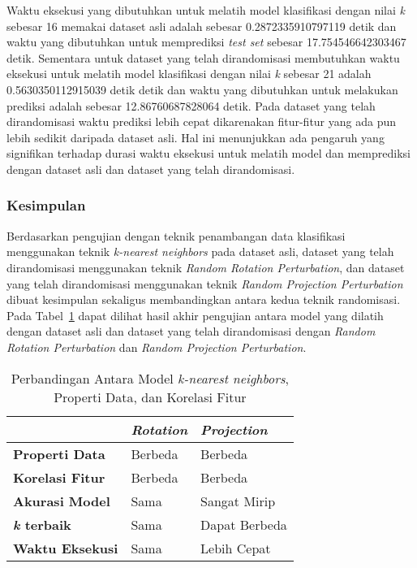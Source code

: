 Waktu eksekusi yang dibutuhkan untuk melatih model klasifikasi dengan nilai \textit{k} sebesar 16 memakai dataset asli adalah sebesar 0.2872335910797119 detik dan waktu yang dibutuhkan untuk memprediksi \textit{test set} sebesar 17.754546642303467 detik. Sementara untuk dataset yang telah dirandomisasi membutuhkan waktu eksekusi untuk melatih model klasifikasi dengan nilai \textit{k} sebesar 21 adalah 0.5630350112915039 detik detik dan waktu yang dibutuhkan untuk melakukan prediksi adalah sebesar 12.86760687828064 detik. Pada dataset yang telah dirandomisasi waktu prediksi lebih cepat dikarenakan fitur-fitur yang ada pun lebih sedikit daripada dataset asli. Hal ini menunjukkan ada pengaruh yang signifikan terhadap durasi waktu eksekusi untuk melatih model dan memprediksi dengan dataset asli dan dataset yang telah dirandomisasi.

\subsubsection{Kesimpulan}
\label{subsubsec:pengujian-klasifikasi-kesimpulan}

Berdasarkan pengujian dengan teknik penambangan data klasifikasi menggunakan teknik \textit{k-nearest neighbors} pada dataset asli, dataset yang telah dirandomisasi menggunakan teknik \textit{Random Rotation Perturbation}, dan dataset yang telah dirandomisasi menggunakan teknik \textit{Random Projection Perturbation} dibuat kesimpulan sekaligus membandingkan antara kedua teknik randomisasi. Pada Tabel~\ref{table:perbandingan-klasifikasi} dapat dilihat hasil akhir pengujian antara model yang dilatih dengan dataset asli dan dataset yang telah dirandomisasi dengan \textit{Random Rotation Perturbation} dan \textit{Random Projection Perturbation}.

\begin{table}
	\centering
	\caption{Perbandingan Antara Model \textit{k-nearest neighbors}, Properti Data, dan Korelasi Fitur}
	\begin{tabular}{|l|l|l|}
		\hline
		& \textbf{\textit{Rotation}} & \textbf{\textit{Projection}} \\ \hline
		\textbf{Properti Data} & Berbeda & Berbeda \\
		\textbf{Korelasi Fitur} & Berbeda & Berbeda \\
		\textbf{Akurasi Model} & Sama & Sangat Mirip \\
		\textbf{\textit{k} terbaik} & Sama & Dapat Berbeda \\
		\textbf{Waktu Eksekusi} & Sama & Lebih Cepat \\
		\hline
	\end{tabular}
	\label{table:perbandingan-klasifikasi}
\end{table}

